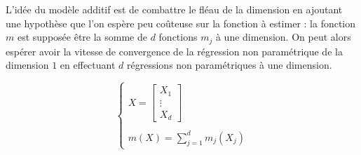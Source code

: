 {
    L'idée du modèle additif est de combattre le fléau de la dimension en ajoutant une hypothèse que l'on espère peu coûteuse sur la fonction à estimer : la fonction $m$ est supposée être la somme de $d$ fonctions $m_j$ à une dimension. On peut alors espérer avoir la vitesse de convergence de la régression non paramétrique de la dimension $1$ en effectuant $d$ régressions non paramétriques à une dimension.

    \begin{equation}
        \begin{cases}
            X = \begin{bmatrix}
                X_1\\
                \vdots\\
                X_d
            \end{bmatrix}
            \\\\
            m(X) = \sum_{j = 1}^d m_j(X_j)
        \end{cases}
    \end{equation}


}

